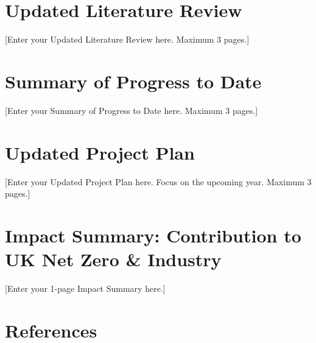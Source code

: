 \documentclass[year2]{../idcore-ar}
\author{Jane Doe}
\begin{document}
\makecoverpage

\section{Updated Literature Review}

[Enter your Updated Literature Review here. Maximum 3 pages.]


\section{Summary of Progress to Date}

[Enter your Summary of Progress to Date here. Maximum 3 pages.]


\section{Updated Project Plan}

[Enter your Updated Project Plan here. Focus on the upcoming year. Maximum 3 pages.]


\section{Impact Summary: Contribution to UK Net Zero \& Industry}

[Enter your 1-page Impact Summary here.]


\newpage
\section{References}
\end{document}
